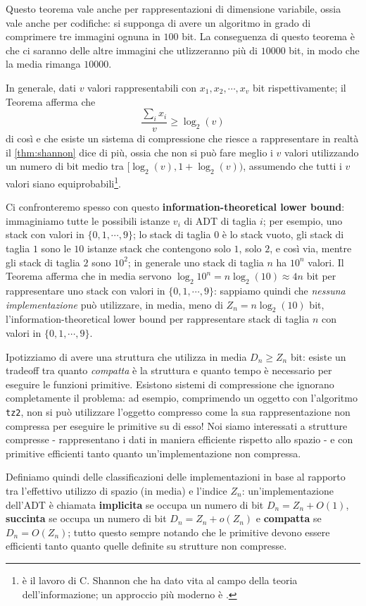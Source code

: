 Questo teorema vale anche per rappresentazioni di dimensione
variabile, ossia vale anche per codifiche: si supponga di avere un
algoritmo in grado di comprimere tre immagini ognuna in $100$ bit.
La conseguenza di questo teorema è che ci saranno delle altre immagini che
utlizzeranno più di $10000$ bit, in modo che la media rimanga $10000$.

In generale, dati $v$ valori rappresentabili con $x_1, x_2, \cdots, x_v$ bit
rispettivamente; il Teorema afferma che
$$
	\frac{\sum_{i} x_i}{v} \geq \log_2(v)
$$
di così e che esiste un sistema di compressione che riesce a rappresentare
in realtà il \cref{thm:shannon} dice di più, ossia che non si può fare meglio
i $v$ valori utilizzando un numero di bit medio tra $[\log_2(v), 1 + \log_2(v))$,
assumendo che tutti i $v$ valori siano equiprobabili\footnote{
	\cite{shannon_1948} è il lavoro di C. Shannon che ha dato vita al campo della
	teoria dell'informazione; un approccio più moderno è \cite{cover_2006}. }.

Ci confronteremo spesso con questo \textbf{information-theoretical lower bound}:
immaginiamo tutte le possibili istanze $v_i$ di ADT di taglia $i$;
per esempio, uno stack con valori in $\{0, 1, \cdots, 9\}$;
lo stack di taglia $0$ è lo stack vuoto, gli stack
di taglia $1$ sono le $10$ istanze stack che contengono solo $1$, solo $2$, e così via,
mentre gli stack di taglia $2$ sono $10^2$; in generale uno stack
di taglia $n$ ha $10^n$ valori. Il Teorema afferma che in media servono
$\log_2{10^n} = n \log_2(10) \approx 4n$ bit per rappresentare uno stack
con valori in $\{0, 1, \cdots, 9\}$: sappiamo quindi che
\textit{nessuna implementazione} può utilizzare, in media, meno di
$Z_n =n \log_2(10)$ bit, l'information-theoretical lower bound per
rappresentare stack di taglia $n$ con valori in $\{0, 1, \cdots, 9\}$.

Ipotizziamo di avere una struttura che utilizza in media $D_n \geq Z_n$ bit:
esiste un tradeoff tra quanto \textit{compatta} è la struttura e quanto
tempo è necessario per eseguire le funzioni primitive.
Esistono sistemi di compressione che ignorano completamente il problema:
ad esempio, comprimendo un oggetto con l'algoritmo \texttt{tz2}, non si può
utilizzare l'oggetto compresso come la sua rappresentazione non compressa
per eseguire le primitive su di esso! Noi siamo interessati a strutture
compresse - rappresentano i dati in maniera efficiente rispetto allo spazio -
e con primitive efficienti tanto quanto un'implementazione non compressa.

Definiamo quindi delle classificazioni delle implementazioni in base al rapporto
tra l'effettivo utilizzo di spazio (in media) e l'indice $Z_n$:
un'implementazione dell'ADT è chiamata \textbf{implicita} se occupa un numero
di bit $D_n = Z_n + O(1)$, \textbf{succinta} se occupa un numero di bit
$D_n = Z_n + o(Z_n)$ e \textbf{compatta} se $D_n = O(Z_n)$; tutto questo sempre
notando che le primitive devono essere efficienti tanto quanto quelle definite
su strutture non compresse.

